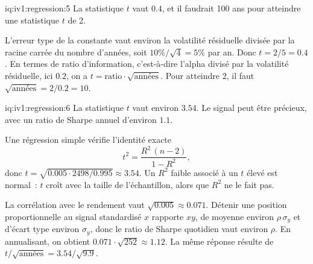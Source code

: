 \begin{solution}{iq:iv1:regression:5}
La statistique $t$ vaut $0.4$, et il faudrait 100 ans pour atteindre une statistique $t$ de 2.

L'erreur type de la constante vaut environ la volatilité résiduelle divisée par la racine carrée du nombre d'années, soit $10\%/\sqrt4 = 5\%$ par an. Donc $t = 2/5 = 0.4$. En termes de ratio d'information, c'est-à-dire l'alpha divisé par la volatilité résiduelle, ici $0.2$, on a $t = \text{ratio} \cdot \sqrt{\text{années}}$. Pour atteindre 2, il faut $\sqrt{\text{années}} = 2/0.2 = 10$.

\end{solution}

\enlargethispage{-6\baselineskip}%
\begin{solution}{iq:iv1:regression:6}
La statistique $t$ vaut environ $3.54$. Le signal peut être précieux, avec un ratio de Sharpe annuel d'environ $1.1$.

Une régression simple vérifie l'identité exacte
\[
t^2 = \frac{R^2\,(n - 2)}{1 - R^2},
\]
donc $t = \sqrt{0.005 \cdot 2498/0.995} \approx 3.54$. Un $R^2$ faible associé à un $t$ élevé est normal~: $t$ croît avec la taille de l'échantillon, alors que $R^2$ ne le fait pas.

La corrélation avec le rendement vaut $\sqrt{0.005} \approx 0.071$. Détenir une position proportionnelle au signal standardisé $x$ rapporte $xy$, de moyenne environ $\rho\,\sigma_y$ et d'écart type environ $\sigma_y$, donc le ratio de Sharpe quotidien vaut environ $\rho$. En annualisant, on obtient $0.071 \cdot \sqrt{252} \approx 1.12$. La même réponse résulte de $t/\sqrt{\text{années}} = 3.54/\sqrt{9.9}$.

\end{solution}

